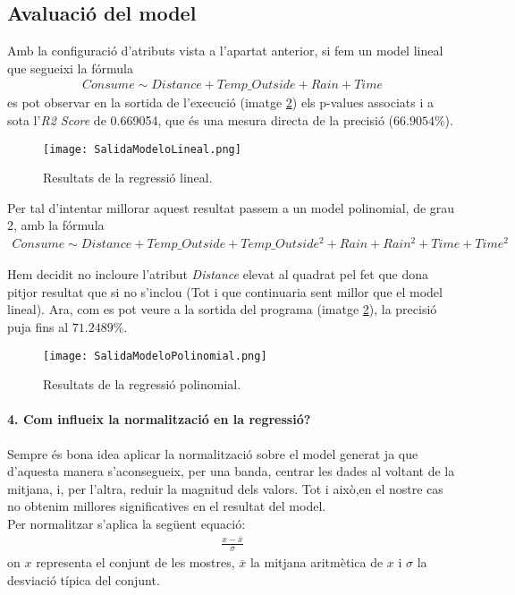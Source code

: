 \documentclass[a4paper, 11pt]{article}
\begin{document}
    \subsection{Avaluació del model}

    Amb la configuració d'atributs vista a l'apartat anterior, si fem un model lineal que segueixi
    la fórmula
    \begin{gather*}
      Consume \sim Distance + Temp\_Outside + Rain + Time
    \end{gather*}
    es pot observar en la sortida de l’execució (imatge \ref{fig:R_L}) els p-values associats
    i a sota l'\textit{R2 Score} de 0.669054, que és una mesura directa de la precisió ($66.9054\%$).

    \begin{figure}[H]
        \centering
        \texttt{[image: SalidaModeloLineal.png]}
        \caption{Resultats de la regressió lineal.}
        \label{fig:R_L}
    \end{figure}

    Per tal d’intentar millorar aquest resultat passem a un model polinomial, de grau 2, amb la
    fórmula
    \begin{gather*}
      Consume \sim Distance + Temp\_Outside + Temp\_Outside^2 + Rain + Rain^2 + Time + Time^2
    \end{gather*}

    Hem decidit no incloure l'atribut \textit{Distance} elevat al quadrat pel fet que dona pitjor
    resultat que si no s'inclou (Tot i que continuaria sent millor que el model lineal). Ara,
    com es pot veure a la sortida del programa (imatge \ref{fig:R_L}), la precisió puja fins al
    $71.2489\%$.

    \begin{figure}[H]
        \centering
        \texttt{[image: SalidaModeloPolinomial.png]}
        \caption{Resultats de la regressió polinomial.}
        \label{fig:R_L}
    \end{figure}



    \paragraph{4. Com influeix la normalització en la regressió?}

    Sempre és bona idea aplicar la normalització sobre el model generat ja que d'aquesta manera
    s'aconsegueix, per una banda, centrar les dades al voltant de la mitjana, i, per l'altra,
    reduir la magnitud dels valors. Tot i això,en el nostre cas no obtenim millores significatives
    en el resultat del model.\\
    Per normalitzar s'aplica la següent equació:
    \begin{gather*}
        \frac{x-\overline{x}}{\sigma}
    \end{gather*}
    on $x$ representa el conjunt de les mostres, $\overline{x}$ la mitjana aritmètica de $x$ i
    $\sigma$ la desviació típica del conjunt.\\
\end{document}
